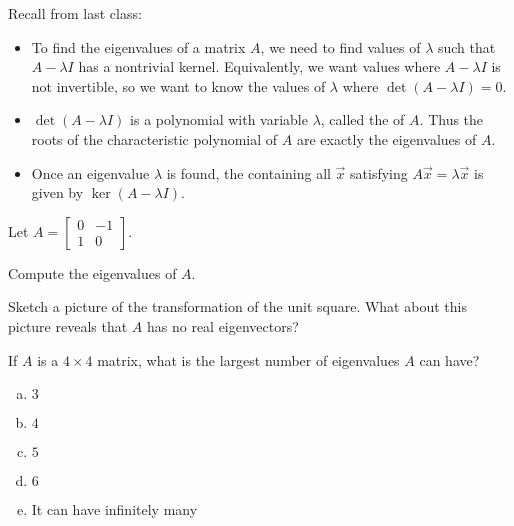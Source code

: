 \begin{applicationActivities}


\begin{observation}
Recall from last class:
\begin{itemize}
\item To find the eigenvalues of a matrix $A$, we need to find values of $\lambda$ such that $A-\lambda I$ has a nontrivial kernel. Equivalently,
we want values where $A-\lambda I$ is not invertible, so we want to know
the values of \(\lambda\) where $\det(A-\lambda I)=0$.
\item $\det(A-\lambda I)$ is a polynomial with variable \(\lambda\),
called the  of $A$. Thus the roots of
the characteristic polynomial of \(A\) are exactly the eigenvalues of \(A\).
\item Once an eigenvalue \(\lambda\) is found, the 
containing all  \(\vec x\) satisfying
\(A\vec x=\lambda\vec x\) is given by $\ker(A-\lambda I)$.
\end{itemize}
\end{observation}

\begin{activity}{5}
Let  $A=\begin{bmatrix}0 & -1 \\ 1 & 0 \end{bmatrix}$.
  \begin{subactivity}
    Compute the eigenvalues of $A$.
  \end{subactivity}
  \begin{subactivity}
     Sketch a picture of the transformation of the unit square.
     What about this picture reveals that \(A\) has no real eigenvectors?
   \end{subactivity}
\end{activity}

\begin{activity}{5}
  If $A$ is a $4 \times 4$ matrix, what is the largest number of eigenvalues $A$ can have?
  \begin{enumerate}[(a)]
  \item $3$
  \item $4$
  \item $5$
  \item $6$
  \item It can have infinitely many
  \end{enumerate}
\end{activity}


\end{applicationActivities}
